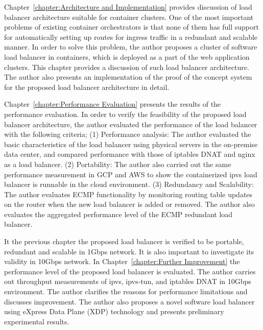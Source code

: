 Chapter~\ref{chapter:Architecture and Implementation} provides discussion of load balancer architecture suitable for container clusters.
One of the most important problems of existing container orchestrators is that none of them has full support for automatically setting up routes for ingress traffic in a redundant and scalable manner.
In order to solve this problem, the author proposes a cluster of software load balancer in containers, which is deployed as a part of the web application clusters.
This chapter provides a discussion of such load balancer architecture.
The author also presents an implementation of the proof of the concept system for the proposed load balancer architecture in detail.

Chapter~\ref{chapter:Performance Evaluation} presents the results of the performance evaluation.
In order to verify the feasibility of the proposed load balancer architecture, the author evaluated the performance of the load balancer with the following criteria;
(1) Performance analysis:
The author evaluated the basic characteristics of the load balancer using physical servers in the on-premise data center, and compared performance with those of iptables DNAT and nginx as a load balancer.
(2) Portability:
The author also carried out the same performance measurement in GCP and AWS to show the containerized ipvs load balancer is runnable in the cloud environment.
(3) Redundancy and Scalability:
The author evaluates ECMP functionality by monitoring routing table updates on the router when the new load balancer is added or removed.
The author also evaluates the aggregated performance level of the ECMP redundant load balancer.

It the previous chapter the proposed load balancer is verified to be portable, redundant and scalable in 1Gbps network.
It is also important to investigate its validity in 10Gbps network.
In Chapter~\ref{chapter:Further Improvement} the performance level of the proposed load balancer is evaluated.
The author carries out throughput measurements of ipvs, ipvs-tun, and iptables DNAT in 10Gbps environment.
The author clarifies the reasons for performance limitations and discusses improvement.
The author also proposes a novel software load balancer using eXpress Data Plane (XDP) technology and presents preliminary experimental results.

